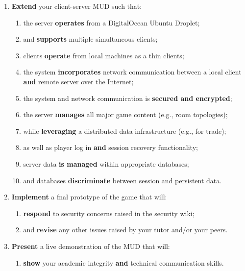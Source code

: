 \documentclass{../../fal_assignment}
\begin{document}
\begin{enumerate}[label=(\Alph*)]
    \item \textbf{Extend} your client-server MUD such that:
    	\begin{enumerate}[label=\roman*.]
    		\item the server \textbf{operates} from a DigitalOcean Ubuntu Droplet;
    		\item and \textbf{supports} multiple simultaneous clients;
    		\item clients \textbf{operate} from local machines as a thin clients;
    		\item the system \textbf{incorporates} network communication between a local client \textbf{and} remote server over the Internet;
    		\item the system and network communication is \textbf{secured and encrypted};
    		\item the server \textbf{manages} all major game content (e.g., room topologies);
    		\item while \textbf{leveraging} a distributed data infrastructure (e.g., for trade);	
    		\item as well as player log in \textbf{and} session recovery functionality;
    		\item server data \textbf{is managed} within appropriate databases;
   		\item and databases \textbf{discriminate} between session and persistent data.
	\end{enumerate}
    \item \textbf{Implement} a fnal prototype of the game that will:
    	\begin{enumerate}[label=\roman*.]
    		\item \textbf{respond} to security concerns raised in the security wiki;
    		\item and \textbf{revise} any other issues raised by your tutor and/or your peers.
	\end{enumerate}
    \item \textbf{Present} a live demonstration of the MUD that will:
    	\begin{enumerate}[label=\roman*.]
    		\item \textbf{show} your academic integrity \textbf{and} technical communication skills.
	\end{enumerate}
\end{enumerate}

\end{document}
